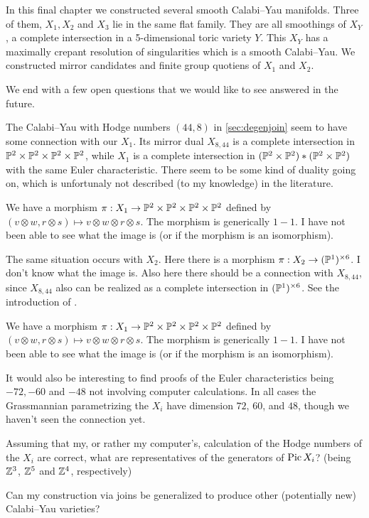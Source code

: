 In this final chapter we constructed several smooth Calabi--Yau manifolds. Three of them, $X_1,X_2$ and $X_3$ lie in the same flat family. They are all smoothings of $X_Y$, a complete intersection in a 5-dimensional toric variety $Y$. This $X_Y$ has a maximally crepant resolution of singularities which is a smooth Calabi--Yau. We constructed mirror candidates and finite group quotiens of $X_1$ and $X_2$.

We end with a few open questions that we would like to see answered in the future.


The Calabi--Yau with Hodge numbers $(44,8)$ in \cref{sec:degenjoin} seem to have some connection with our $X_1$. Its mirror dual $X_{8,44}$ is a complete intersection in $\P^2 \times \P^2 \times \P^2 \times \P^2$, while $X_1$ is a complete intersection in $(\P^2 \times \P^2) \ast (\P^2 \times \P^2)$ with the same Euler characteristic. There seem to be some kind of duality going on, which is unfortunaly not described (to my knowledge) in the literature.

We have a morphism $\pi:X_1 \to \P^2 \times \P^2 \times \P^2 \times \P^2$ defined by $(v \otimes w, r \otimes s) \mapsto v \otimes w \otimes r \otimes s$. The morphism is generically $1-1$. I have not been able to see what the image is (or if the morphism is an isomorphism).

The same situation occurs with $X_2$. Here there is a morphism ${\pi:X_2 \to (\P^1)^{\times 6}}$. I don't know what the image is. Also here there should be a connection with $X_{8,44}$, since $X_{8,44}$ also can be realized as a complete intersection in $(\P^1)^{\times 6}$. See the introduction of \cite{braun_smallhodgenumbers}.

We have a morphism $\pi:X_1 \to \P^2 \times \P^2 \times \P^2 \times \P^2$ defined by $(v \otimes w, r \otimes s) \mapsto v \otimes w \otimes r \otimes s$. The morphism is generically $1-1$. I have not been able to see what the image is (or if the morphism is an isomorphism).

It would also be interesting to find proofs of the Euler characteristics being $-72,-60$ and $-48$ not involving computer calculations. In all cases the Grassmannian parametrizing the $X_i$ have dimension $72$, $60$, and $48$, though we haven't seen the connection yet.

Assuming that my, or rather my computer's, calculation of the Hodge numbers of the $X_i$ are correct, what are representatives of the generators of $\Pic X_i$? (being $\Z^3$, $\Z^5$ and $\Z^4$, respectively)

Can my construction via joins be generalized to produce other (potentially new) Calabi--Yau varieties?